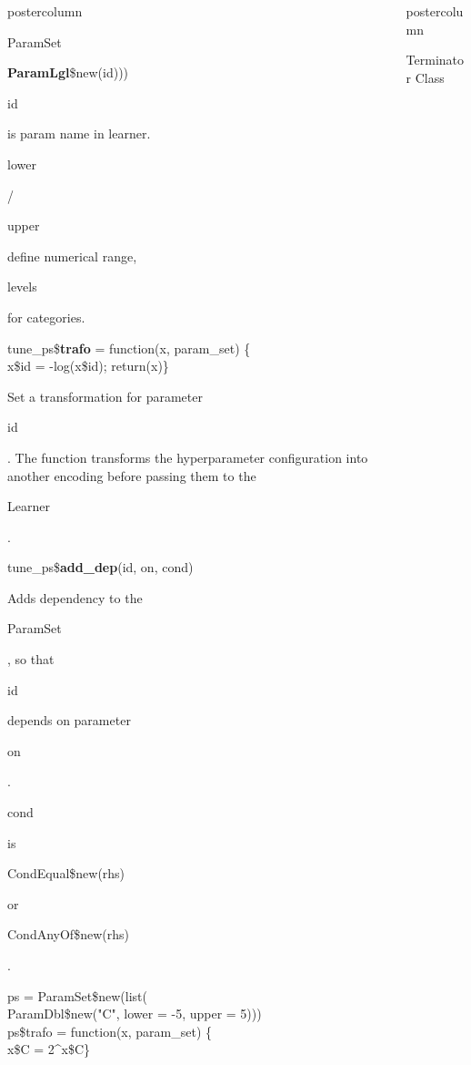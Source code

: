 \documentclass{beamer}
\newlength{\columnheight} %
\newcommand{\codeinline}[1]{\begin{codeboxinline}#1\end{codeboxinline}}
\begin{document}
\begin{frame}[fragile]{}
\begin{columns}
\begin{column}{.245\textwidth}
\begin{beamercolorbox}[center]{postercolumn}
\begin{minipage}{.98\textwidth}
{\begin{myblock}{ParamSet}
\begin{codeboxmultiline}[width=21cm]
								\hspace*{1ex}\textbf{ParamLgl}\$new(id)))
							\end{codeboxmultiline}
                            \codeinline{id} is param name in learner. \codeinline{lower}/\codeinline{upper} define numerical range, \codeinline{levels} for categories. 
							\begin{codeboxmultiline}[width=26cm]
								tune\_ps\$\textbf{trafo} = function(x, param\_set) \{ \\
								\hspace*{1ex}x\$id = -log(x\$id); return(x)\}      
							\end{codeboxmultiline}
							Set a transformation for parameter \codeinline{id}. 
							The function transforms the hyperparameter configuration into another encoding 
							before passing them to the \codeinline{Learner}.
							\\
							\begin{codebox}
								tune\_ps\$\textbf{add\_dep}(id, on, cond)
							\end{codebox}
							Adds dependency to the \codeinline{ParamSet}, so that \codeinline{id} depends on parameter \codeinline{on}.
							\codeinline{cond} is \codeinline{CondEqual\$new(rhs)} or \codeinline{CondAnyOf\$new(rhs)}.
							\\
							\begin{codeboxexample}
								\footnotesize{
									ps = ParamSet\$new(list(\\
									\hspace*{1ex}ParamDbl\$new("C", lower = -5, upper = 5)))
									\vspace{1em}
									\\
									ps\$trafo = function(x, param\_set) \{\\
									\hspace*{1ex} x\$C = 2\textasciicircum x\$C\}
								}
							\end{codeboxexample}
						\end{myblock}
						\vfill}
				\end{minipage}
			\end{beamercolorbox}
		\end{column}
		\begin{column}{.245\textwidth}
			\begin{beamercolorbox}[center]{postercolumn}
				\begin{minipage}{.98\textwidth}
					\parbox[t][\columnheight]{\textwidth}{
						\begin{myblock}{Terminator Class}

\end{myblock}}
\end{minipage}
\end{beamercolorbox}
\end{column}
\end{columns}
\end{frame}
\end{document}
